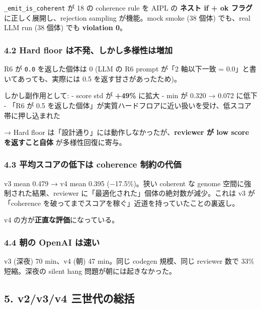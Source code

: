 \documentclass[
]{ltjsarticle}
\begin{document}
\texttt{\_emit\_is\_coherent} が 18 の coherence rule を AIPL の
\textbf{ネスト if + ok フラグ} に正しく展開し、rejection sampling
が機能。mock smoke (38 個体) でも、real LLM run (38 個体) でも
\textbf{violation 0}。

\subsubsection{4.2 Hard floor
は不発、しかし多様性は増加}\label{hard-floor-ux306fux4e0dux767aux3057ux304bux3057ux591aux69d8ux6027ux306fux5897ux52a0}

R6 が \texttt{0.0} を返した個体は 0 (LLM の R6 prompt が「2 軸以下一致 =
0.0」と書いてあっても、実際には 0.5 を返す甘さがあったため)。

しかし副作用として: - score std が \textbf{+49\%} に拡大 - min が 0.320
→ 0.072 に低下 - 「R6 が 0.5
を返した個体」が実質ハードフロアに近い扱いを受け、低スコア帯に押し込まれた

→ Hard floor は「設計通り」には動作しなかったが、\textbf{reviewer が low
score を返すこと自体} が多様性回復に寄与。

\subsubsection{4.3 平均スコアの低下は coherence
制約の代価}\label{ux5e73ux5747ux30b9ux30b3ux30a2ux306eux4f4eux4e0bux306f-coherence-ux5236ux7d04ux306eux4ee3ux4fa1}

v3 mean 0.479 → v4 mean 0.395 (−17.5\%)。狭い coherent な genome
空間に強制された結果、reviewer
に「最適化された」個体の絶対数が減少。これは v3 が「coherence
を破ってまでスコアを稼ぐ」近道を持っていたことの裏返し。

v4 の方が\textbf{正直な評価}になっている。

\subsubsection{4.4 朝の OpenAI
は速い}\label{ux671dux306e-openai-ux306fux901fux3044}

v3 (深夜) 70 min、v4 (朝) 47 min。同じ codegen 規模、同じ reviewer 数で
33\% 短縮。深夜の silent hang 問題が朝には起きなかった。

\subsection{5. v2/v3/v4
三世代の総括}\label{v2v3v4-ux4e09ux4e16ux4ee3ux306eux7dcfux62ec}
\end{document}

